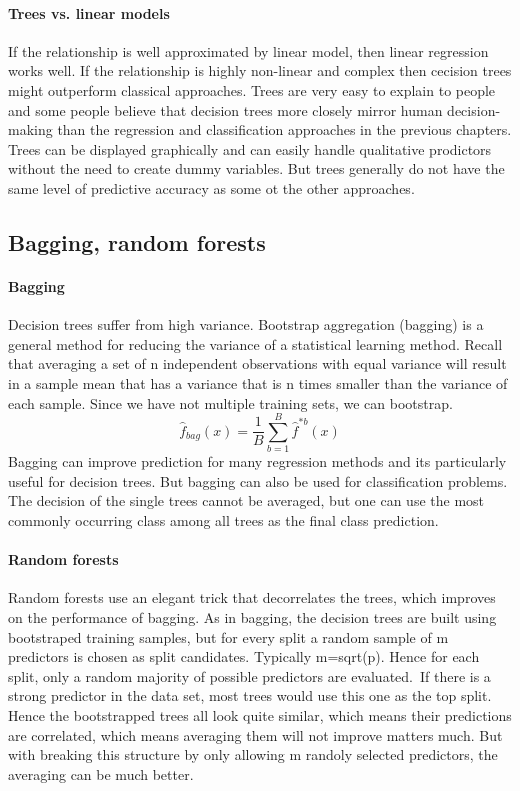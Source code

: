 \documentclass[../document.tex]{subfiles}
\begin{document}
	\paragraph{Trees vs. linear models}
	If the relationship is well approximated by linear model, then linear regression works well. If the relationship is highly non-linear and complex then cecision trees might outperform classical approaches. Trees are very easy to explain to people and some people believe that decision trees more closely mirror human decision-making than the regression and classification approaches in the previous chapters. Trees can be displayed graphically and can easily handle qualitative prodictors without the need to create dummy variables. But trees generally do not have the same level of predictive accuracy as some ot the other approaches.
	\subsection{Bagging, random forests}
	\paragraph{Bagging}
	Decision trees suffer from high variance. Bootstrap aggregation (bagging) is a general method for reducing the variance of a statistical learning method. Recall that averaging a set of n independent observations with equal variance will result in a sample mean that has a variance that is n times smaller than the variance of each sample.
	Since we have not multiple training sets, we can bootstrap. 
	\begin{equation}
		\hat{f}_{bag}(x)=\frac{1}{B}\sum_{b=1}^{B}\hat{f}^{*b}(x)
	\end{equation}
	Bagging can improve prediction for many regression methods and its particularly useful for decision trees. But bagging can also be used for classification problems. The decision of the single trees cannot be averaged, but one can use the most commonly occurring class among all trees as the final class prediction.
	\paragraph{Random forests}
	Random forests use an elegant trick that decorrelates the trees, which improves on the performance of bagging. As in bagging, the decision trees are built using bootstraped training samples, but for every split a random sample of m predictors is chosen as split candidates. Typically m=sqrt(p). Hence for each split, only a random majority of possible predictors are evaluated.\
	If there is a strong predictor in the data set, most trees would use this one as the top split. Hence the bootstrapped trees all look quite similar, which means their predictions are correlated, which means averaging them will not improve matters much. But with breaking this structure by only allowing m randoly selected predictors, the averaging can be much better.
\end{document}

